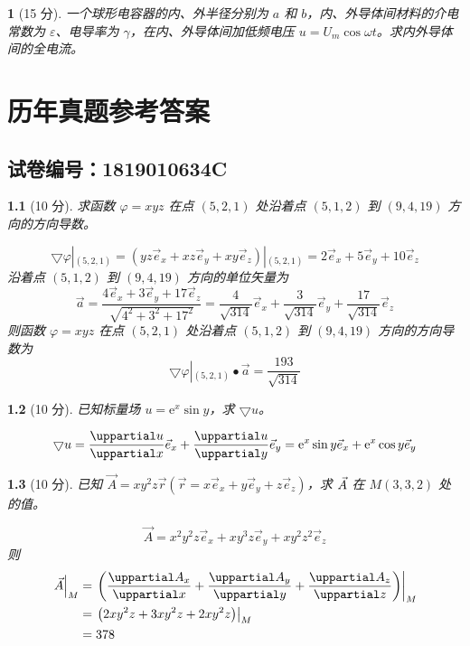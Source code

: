 \documentclass{book}
\theoremstyle{change}
\newtheorem{ti}{}[section]
\let\div\relax\let\grad\relax
\DeclareMathOperator{\div}{div}
\DeclareMathOperator{\grad}{grad}
\def\partial{\uppartial}
\def\ee{\mathrm{e}}
\begin{document}
\begin{ti}[15 分]
	一个球形电容器的内、外半径分别为 $a$ 和 $b$，内、外导体间材料的介电常数为 $\varepsilon$、电导率为 $\gamma$，在内、外导体间加低频电压 $u=U_m\cos\omega t$。求内外导体间的全电流。
\end{ti}




\chapter{历年真题参考答案}
\section{试卷编号：1819010634C}
\begin{ti}[10 分]
	求函数 $\varphi=xyz$ 在点 $(5,2,1)$ 处沿着点 $(5,1,2)$ 到 $(9,4,19)$ 方向的方向导数。
	\begin{solution}
		\[
			\bigtriangledown\varphi\left|_{(5,2,1)}\right.=(yz\vec{e}_x+xz\vec{e}_y+xy\vec{e}_z)\left|_{(5,2,1)}\right.=2\vec{e}_x+5\vec{e}_y+10\vec{e}_z
		\]
		沿着点 $(5,1,2)$ 到 $(9,4,19)$ 方向的单位矢量为
		\[
			\vec{a}=\frac{4\vec{e}_x+3\vec{e}_y+17\vec{e}_z}{\sqrt{4^2+3^2+17^2}}=\frac{4}{\sqrt{314}}\vec{e}_x+\frac{3}{\sqrt{314}}\vec{e}_y+\frac{17}{\sqrt{314}}\vec{e}_z
		\]
		则函数 $\varphi=xyz$ 在点 $(5,2,1)$ 处沿着点 $(5,1,2)$ 到 $(9,4,19)$ 方向的方向导数为
		\[
			\bigtriangledown\varphi\left|_{(5,2,1)}\right.\bullet\vec{a}=\frac{193}{\sqrt{314}}
		\]
	\end{solution}
\end{ti}

\begin{ti}[10 分]
	已知标量场 $u=\ee ^x\sin y$，求 $\bigtriangledown u$。
	\begin{solution}
		\[
		\bigtriangledown u = \frac{\partial u}{\partial x}\vec{e}_x+\frac{\partial u}{\partial y}\vec{e}_y
		= \ee ^x\sin y\vec{e}_x+\ee ^x\cos y\vec{e}_y
		\]
	\end{solution}
\end{ti}

\begin{ti}[10 分]
	已知 $\vec{A}=xy^2z\vec{r}(\vec{r}=x\vec{e}_x+y\vec{e}_y+z\vec{e}_z)$，求 $\div \vec{A}$ 在 $M(3,3,2)$ 处的值。
	\begin{solution}
		\[
			\vec{A}=x^2y^2z\vec{e}_x+xy^3z\vec{e}_y+xy^2z^2\vec{e}_z
		\]
		则
		\begin{align*}
			\left.\div \vec A\right|_M&= \left.\left(\frac{\partial A_x}{\partial x}+\frac{\partial A_y}{\partial y}+\frac{\partial A_z}{\partial z}\right)\right|_M\\
			&= \left.\left(2xy^2z+3xy^2z+2xy^2 z\right)\right|_M\\
			&= 378
		\end{align*}
	\end{solution}
\end{ti}
\end{document}
